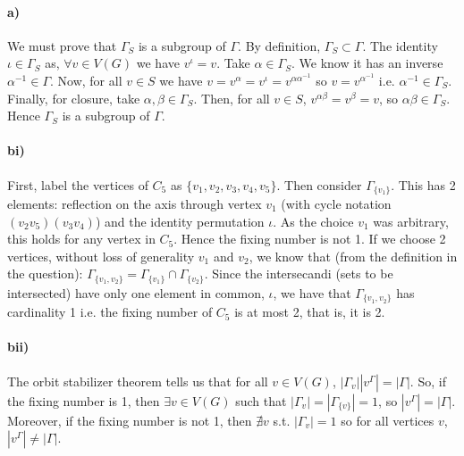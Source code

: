 \paragraph*{a)}
We must prove that $\Gamma_S$ is a subgroup of $\Gamma$. By definition, $\Gamma_S \subset \Gamma$.
The identity $\iota \in \Gamma_S$ as, $\forall v \in V(G)$ we have $v^{\iota} = v$.
Take $\alpha \in \Gamma_S$. We know it has an inverse $\alpha^{-1} \in \Gamma$.
Now, for all $v \in S$ we have 
$v = v^{\alpha} = v^{\iota} = v^{\alpha \alpha^{-1}}$ so $v= v^{\alpha^{-1}}$ i.e. $\alpha^{-1} \in \Gamma_S$.
Finally, for closure, take $\alpha,\beta \in \Gamma_S$. Then, for all $v \in S$,
$v^{\alpha \beta} = v^{\beta} = v$, so $\alpha \beta \in \Gamma_S$. 
Hence $\Gamma_S$ is a subgroup of $\Gamma$.

\paragraph*{bi)} First, label the vertices of $C_5$ as $\{v_1, v_2, v_3, v_4, v_5 \}$. 
Then consider $\Gamma_{\{ v_1 \} }$. This has 2 elements:
reflection on the axis through vertex $v_1$ 
(with cycle notation $\left(v_2 v_5\right) \left(v_3 v_4 \right)$)
and the identity permutation $\iota$.
As the choice $v_1$ was arbitrary, this holds for any vertex in $C_5$.
Hence the fixing number is not 1.
If we choose 2 vertices, without loss of generality $v_1$ and $v_2$,
we know that (from the definition in the question): 
$\Gamma_{\{ v_1, v_2 \} } = \Gamma_{\{ v_1 \} } \cap \Gamma_{\{ v_2 \} }$.
Since the intersecandi (sets to be intersected) have only one element
in common, $\iota$, we have that $\Gamma_{\{ v_1, v_2 \} }$ has cardinality 1 
i.e. the fixing number of $C_5$ is at most 2, that is, it is 2.

\paragraph*{bii)} The orbit stabilizer theorem tells us that for all $v \in V(G)$,
$|\Gamma_v| |v^{\Gamma}| = |\Gamma|$.
So, if the fixing number is 1, then $\exists v \in V(G)$ such that 
$|\Gamma_v|= |\Gamma_{ \{ v \} }| = 1$, so $|v^{\Gamma}| = |\Gamma | $.
Moreover, if the fixing number is not 1, then $\nexists v$ s.t. 
$|\Gamma_v| = 1$ so for all vertices $v$, $|v^{\Gamma}| \neq |\Gamma|$.
